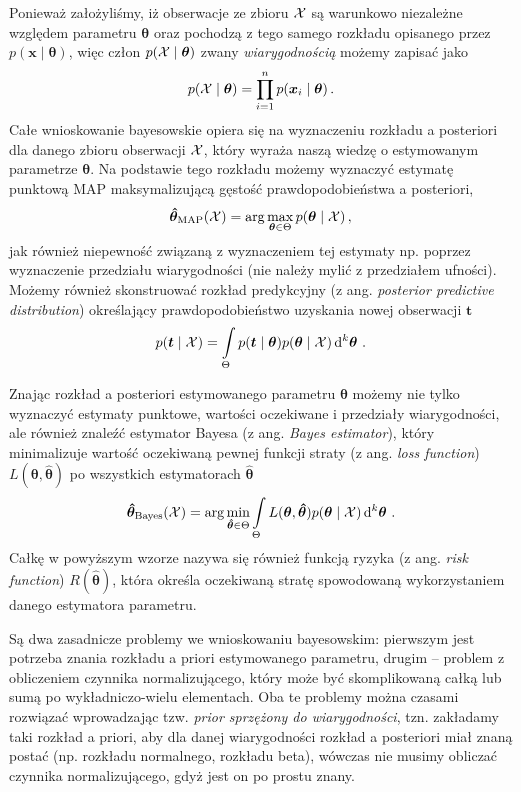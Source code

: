 \documentclass{myclass}
\numberwithin{equation}{subsection}
\begin{document}
Ponieważ założyliśmy, iż obserwacje ze zbioru \(\mathcal{X}\) są warunkowo niezależne względem parametru
\(\bm{\theta}\) oraz pochodzą z tego samego rozkładu opisanego przez \(p(\bm{x} \mid \bm{\theta})\),
więc człon \(p(\mathcal{X} \mid \bm{\theta})\) zwany \emph{wiarygodnością} możemy zapisać jako
\begin{equation}
    p(\mathcal{X} \mid \bm{\theta}) = \prod_{i=1}^n p(\bm{x}_i \mid \bm{\theta})\,.    
\end{equation}
Całe wnioskowanie bayesowskie opiera się na wyznaczeniu rozkładu a posteriori dla danego zbioru
obserwacji \(\mathcal{X}\), który wyraża naszą wiedzę o estymowanym parametrze \(\bm{\theta}\). Na
podstawie tego rozkładu możemy wyznaczyć estymatę punktową MAP maksymalizującą gęstość
prawdopodobieństwa a posteriori, 
\begin{equation}
    \bm{\hat \theta}_\mathrm{MAP}(\mathcal{X}) = \arg \max_{\bm{\theta} \in \Theta} p(\bm{\theta} \mid \mathcal{X})\,,
\end{equation}
jak również niepewność związaną z wyznaczeniem tej estymaty np. poprzez wyznaczenie przedziału
wiarygodności (nie należy mylić z przedziałem ufności). Możemy również skonstruować rozkład
predykcyjny (z ang. \textit{posterior predictive distribution}) określający prawdopodobieństwo
uzyskania nowej obserwacji \(\bm{t}\)\
\begin{equation}
    p(\bm{t} \mid \mathcal{X}) = \int\limits_\Theta p(\bm{t} \mid \bm{\theta}) p(\bm{\theta} \mid \mathcal{X}) \dd[k]{\bm{\theta}}\,.
\end{equation}

Znając rozkład a posteriori estymowanego parametru \(\bm{\theta}\) możemy nie tylko wyznaczyć
estymaty punktowe, wartości oczekiwane i przedziały wiarygodności, ale również znaleźć estymator
Bayesa (z ang. \textit{Bayes estimator}), który minimalizuje wartość oczekiwaną pewnej funkcji
straty (z ang. \textit{loss function}) \(L(\bm{\theta}, \bm{\hat \theta})\) po wszystkich
estymatorach \(\bm{\hat \theta}\)
\begin{equation}
    \bm{\hat \theta}_\mathrm{Bayes}(\mathcal{X}) = \arg\min_{\bm{\hat \theta} \in \Theta} \int\limits_{\Theta} L(\bm{\theta}, \bm{\hat \theta}) p(\bm{\theta} \mid \mathcal{X}) \dd[k]{\bm{\theta}}\,.
\end{equation}
Całkę w powyższym wzorze nazywa się również funkcją ryzyka (z ang. \textit{risk function})
\(R(\bm{\hat \theta})\), która określa oczekiwaną stratę spowodowaną wykorzystaniem danego
estymatora parametru.

Są dwa zasadnicze problemy we wnioskowaniu bayesowskim: pierwszym jest potrzeba znania rozkładu a
priori estymowanego parametru, drugim -- problem z obliczeniem czynnika normalizującego, który może
być skomplikowaną całką lub sumą po wykładniczo-wielu elementach. Oba te problemy można czasami
rozwiązać wprowadzając tzw. \emph{prior sprzężony do wiarygodności}, tzn. zakładamy taki rozkład a
priori, aby dla danej wiarygodności rozkład a posteriori miał znaną postać (np. rozkładu normalnego,
rozkładu beta), wówczas nie musimy obliczać czynnika normalizującego, gdyż jest on po prostu znany.
\end{document}
